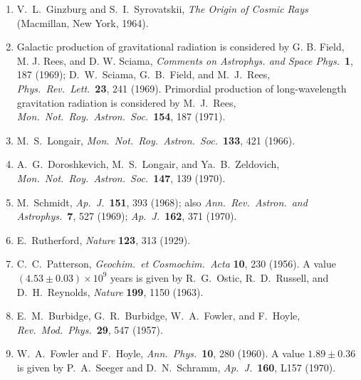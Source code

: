 \begin{enumerate}
  \item{}\label{ch15-ref-14}
  V.~L.~Ginzburg and S.~I.~Syrovatskii,
  \emph{The Origin of Cosmic Rays} (Macmillan, New York, 1964).

  \item[14a.]\label{ch15-ref-14a}
  Galactic production of gravitational radiation is considered by
  G. B. Field, M. J. Rees, and D. W. Sciama,
  \emph{Comments on Astrophys. and Space Phys.}\ \textbf{1}, 187 (1969);
  D.~W.~Sciama, G.~B.~Field, and M.~J.~Rees,
  \emph{Phys.\ Rev.\ Lett.}\ \textbf{23}, 241 (1969).
  Primordial production of long-wavelength gravitation radiation is considered
  by M.~J.~Rees, \emph{Mon.\ Not.\ Roy.\ Astron.\ Soc.}\
  \textbf{154}, 187 (1971).

  \item{}\label{ch15-ref-15}
  M.~S.~Longair, \emph{Mon.\ Not.\ Roy.\ Astron.\ Soc.}\
  \textbf{133}, 421 (1966).

  \item{}\label{ch15-ref-16}
  A.~G.~Doroshkevich, M.~S.~Longair, and Ya.~B.~Zeldovich,
  \emph{Mon.\ Not.\ Roy.\ Astron.\ Soc.}\ \textbf{147}, 139 (1970).

  \item\phantomsection\label{ch15-ref-17}
  M.~Schmidt, \emph{Ap.\ J.}\ \textbf{151}, 393 (1968);
  also \emph{Ann.\ Rev.\ Astron.\ and Astrophys.}\ \textbf{7}, 527 (1969);
  \emph{Ap.\ J.}\ \textbf{162}, 371 (1970).

  \item{}\label{ch15-ref-18}
  E.~Rutherford, \emph{Nature} \textbf{123}, 313 (1929).

  \item\phantomsection\label{ch15-ref-19}
  C.~C.~Patterson, \emph{Geochim.\ et Cosmochim.\ Acta} \textbf{10},
  230 (1956). A value \((4.53\pm0.03)\times10^9\) years is given by
  R.~G.~Ostic, R.~D.~Russell, and D.~H.~Reynolds,
  \emph{Nature} \textbf{199}, 1150 (1963).

  \item{}\label{ch15-ref-20}
  E.~M.~Burbidge, G.~R.~Burbidge, W.~A.~Fowler, and F.~Hoyle,
  \emph{Rev.\ Mod.\ Phys.}\ \textbf{29}, 547 (1957).

  \item{}\label{ch15-ref-21}
  W.~A.~Fowler and F.~Hoyle, \emph{Ann.\ Phys.}\ \textbf{10}, 280 (1960).
  A value \(1.89\pm0.36\) is given by P.~A.~Seeger and D.~N.~Schramm,
  \emph{Ap.\ J.}\ \textbf{160}, L157 (1970).


\end{enumerate}
